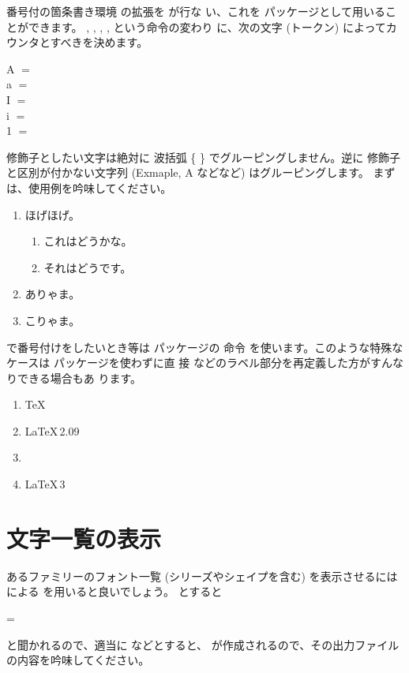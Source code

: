番号付の箇条書き環境  の拡張を が行な
い、これを  パッケージとして用いることができます。
, , , ,  という命令の変わり
に、次の文字 (トークン) によってカウンタとすべきを決めます。
\begin{Syntax}
A $=$  \\
a $=$  \\
I $=$  \\
i $=$  \\
1 $=$ 
\end{Syntax}
修飾子としたい文字は絶対に 波括弧 \{ \} でグルーピングしません。逆に
修飾子と区別が付かない文字列 (Exmaple, A などなど) はグルーピングします。
まずは、使用例を吟味してください。
\begin{InOut}
\usepackage{okumacro,graphicx}
\usepackage{enumerate}
\begin{enumerate}[{例題} 1]
  \item\label{exe:a} ほげほげ。
   \begin{enumerate}
    \item これはどうかな。
    \item それはどうです。
   \end{enumerate}
  \item ありゃま。
  \item こりゃま。
\end{enumerate}
\end{InOut}
で番号付けをしたいとき等は  パッケージの  命令
を使います。このような特殊なケースは  パッケージを使わずに直
接  などのラベル部分を再定義した方がすんなりできる場合もあ
ります。
\begin{inputex}
\begin{enumerate}
\item \TeX
\item \LaTeX\,2.09
\item \LaTeXe
\item \LaTeX\,3
\end{enumerate} 
\end{inputex}



\section{文字一覧の表示\texorpdfstring{\zdash}{---}}
あるファミリーのフォント一覧 (シリーズやシェイプを含む) を表示させるには
による  を用いると良いでしょう。
とすると
\begin{OutTerm}
\family=
\end{OutTerm}
と聞かれるので、適当に  などとすると、 
が作成されるので、その出力ファイルの内容を吟味してください。


